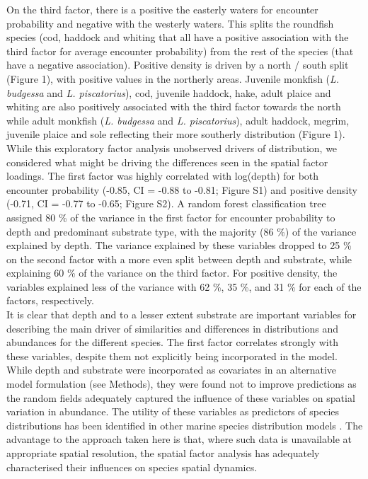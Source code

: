 \documentclass[fleqn,10pt]{wlscirep}
\begin{document}
\begin{linenumbers}
On the third factor, there is a positive  the easterly waters for encounter probability
and negative  with the westerly waters. This splits
the roundfish species (cod, haddock and whiting that all have a positive
association with the third factor for average encounter probability) from the
rest of the species (that have a negative association). Positive density is
driven by a north / south split (Figure 1), with positive
 values in the northerly areas. Juvenile monkfish
(\emph{L.  budgessa} and \emph{L.  piscatorius}), cod, juvenile haddock, hake,
adult plaice and whiting are also positively associated with the third factor
towards the north while adult monkfish (\emph{L. budgessa} and \emph{L.
	piscatorius}), adult haddock, megrim, juvenile plaice and sole
 reflecting
their more southerly distribution (Figure 1).\\

While this exploratory factor analysis 
unobserved drivers of distribution, we considered what might be driving the
differences seen in the spatial factor 
loadings. The first factor was highly correlated with log(depth) for both
 encounter probability 
(-0.85, CI = -0.88 to -0.81; Figure S1) and  positive
density  (-0.71, CI = -0.77 to -0.65; Figure S2). A
random forest classification tree assigned 80 \% of the variance in the first
factor for  encounter probability to depth and
predominant substrate type, with the majority (86 \%) of the variance explained
by depth.
The variance explained by these variables dropped to 25 \% on the second factor
with a more even split between depth and substrate, while explaining 60 \% of
the variance on the third factor.  For  positive density,
the variables explained less of the variance with 62 \%, 35 \%, and 31 \% for
each of the factors, respectively.\\ 

It is clear that depth and to a lesser extent substrate are important variables
for describing the main driver of similarities and differences in distributions
and abundances for the different species. The first factor correlates strongly
with these variables, despite them not explicitly being incorporated in the
model. While depth and substrate were incorporated as covariates in an
alternative model formulation (see Methods), they were found not to improve
predictions as the random fields adequately captured the influence of these
variables on spatial variation in abundance. The utility of these variables as
predictors of species distributions has been identified in other marine species
distribution models \cite{Robinson2011}. The advantage to the approach taken
here is that, where such data is unavailable at appropriate spatial resolution,
the spatial factor analysis has adequately characterised their influences on
species spatial dynamics.\\


\end{linenumbers}
\end{document}

